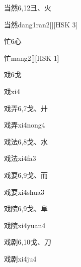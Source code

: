 \begin{entry}{当然}{6,12}{⼹、⽕}
  \begin{phonetics}{当然}{dang1ran2}[][HSK 3]
  \end{phonetics}
\end{entry}

\begin{entry}{忙}{6}{⼼}
  \begin{phonetics}{忙}{mang2}[][HSK 1]
  \end{phonetics}
\end{entry}

\begin{entry}{戏}{6}{⼽}
  \begin{phonetics}{戏}{xi4}
  \end{phonetics}
\end{entry}

\begin{entry}{戏弄}{6,7}{⼽、⼶}
  \begin{phonetics}{戏弄}{xi4nong4}
  \end{phonetics}
\end{entry}

\begin{entry}{戏法}{6,8}{⼽、⽔}
  \begin{phonetics}{戏法}{xi4fa3}
  \end{phonetics}
\end{entry}

\begin{entry}{戏耍}{6,9}{⼽、⽽}
  \begin{phonetics}{戏耍}{xi4shua3}
  \end{phonetics}
\end{entry}

\begin{entry}{戏院}{6,9}{⼽、⾩}
  \begin{phonetics}{戏院}{xi4yuan4}
  \end{phonetics}
\end{entry}

\begin{entry}{戏剧}{6,10}{⼽、⼑}
  \begin{phonetics}{戏剧}{xi4ju4}
  \end{phonetics}
\end{entry}


